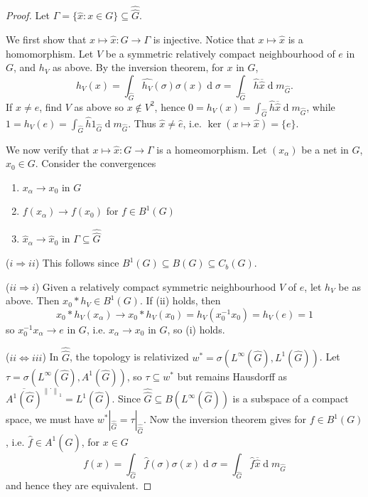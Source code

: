 \documentclass[11pt, a4paper]{memoir}
\newcommand{\imp}[2]{($#1\Rightarrow#2$)\hspace{0.2cm}}
\newcommand{\impe}[2]{($#1\Leftrightarrow#2$)\hspace{0.2cm}}
\newcommand{\norm}[1]{\ensuremath{\left\lVert#1\right\rVert}}
\theoremstyle{change}
\theoremstyle{plain}
\theoremstyle{nonumberplain}
\newtheorem{proof}{Proof}
\renewcommand{\d}[1]{\ensuremath{\operatorname{d}\!{#1}}}
\numberwithin{equation}{section}
\begin{document}
\begin{proof}
    Let $\Gamma=\{\hat{x}:x\in G\}\subseteq\widehat{\widehat{G}}$.

    We first show that $x\mapsto\hat{x}:G\to\Gamma$ is injective.
    Notice that $x\mapsto\hat{x}$ is a homomorphism.
    Let $V$ be a symmetric relatively compact neighbourhood of $e$ in $G$, and $h_V$ as above.
    By the inversion theorem, for $x$ in $G$,
    \begin{equation*}
        h_V(x)=\int_{\widehat{G}}\widehat{h_V}(\sigma)\sigma(x)\d{\sigma}=\int_{\widehat{G}}\hat{h}\overline{\hat{x}}\d{m_{\widehat{G}}}.
    \end{equation*}
    If $x\neq e$, find $V$ as above so $x\notin V^2$, hence $0=h_V(x)=\int_{\widehat{G}}\hat{h}\overline{\hat{x}}\d{m_{\widehat{G}}}$, while $1=h_V(e)=\int_{\widehat{G}}\hat{h}1_{\widehat{G}}\d{m_{\widehat{G}}}$.
    Thus $\hat{x}\neq\hat{e}$, i.e. $\ker(x\mapsto\hat{x})=\{e\}$.

    We now verify that $x\mapsto\hat{x}:G\to\Gamma$ is a homeomorphism.
    Let $(x_\alpha)$ be a net in $G$, $x_0\in G$.
    Consider the convergences
    \begin{enumerate}[nl,r]
        \item $x_\alpha\to x_0$ in $G$
        \item $f(x_\alpha)\to f(x_0)$ for $f\in B^1(G)$
        \item $\hat{x}_\alpha\to\hat{x}_0$ in $\Gamma\subseteq\widehat{\widehat{G}}$
    \end{enumerate}
    \imp{i}{ii}
    This follows since $B^1(G)\subseteq B(G)\subseteq C_b(G)$.

    \imp{ii}{i}
    Given a relatively compact symmetric neighbourhood $V$ of $e$, let $h_V$ be as above.
    Then $x_0*h_V\in B^1(G)$.
    If (ii) holds, then
    \begin{equation*}
        x_0*h_V(x_\alpha)\to x_0*h_V(x_0)=h_V(x_0^{-1}x_0)=h_V(e)=1
    \end{equation*}
    so $x_0^{-1}x_\alpha\to e$ in $G$, i.e. $x_\alpha\to x_0$ in $G$, so (i) holds.

    \impe{ii}{iii}
    In $\widehat{\widehat{G}}$, the topology is relativized $w^*=\sigma(L^\infty(\widehat{G}),L^1(\widehat{G}))$.
    Let $\tau=\sigma(L^\infty(\widehat{G}),A^1(\widehat{G}))$, so $\tau\subseteq w^*$ but remains Hausdorff as $\overline{A^1(\widehat{G})}^{\norm{\cdot}_1}=L^1(\widehat{G})$.
    Since $\widehat{\widehat{G}}\subseteq B(L^\infty(\widehat{G}))$ is a subspace of a compact space, we must have $w^*|_{\widehat{\widehat{G}}}=\tau|_{\widehat{\widehat{G}}}$.
    Now the inversion theorem gives for $f\in B^1(G)$, i.e. $\hat{f}\in A^1(\widehat{G})$, for $x\in G$
    \begin{equation*}
        f(x)=\int_{\widehat{G}}\hat{f}(\sigma)\sigma(x)\d{\sigma}=\int_{\widehat{G}}\hat{f}\overline{\hat{x}}\d{m_{\widehat{G}}}
    \end{equation*}
    and hence they are equivalent.


\end{proof}
\end{document}
